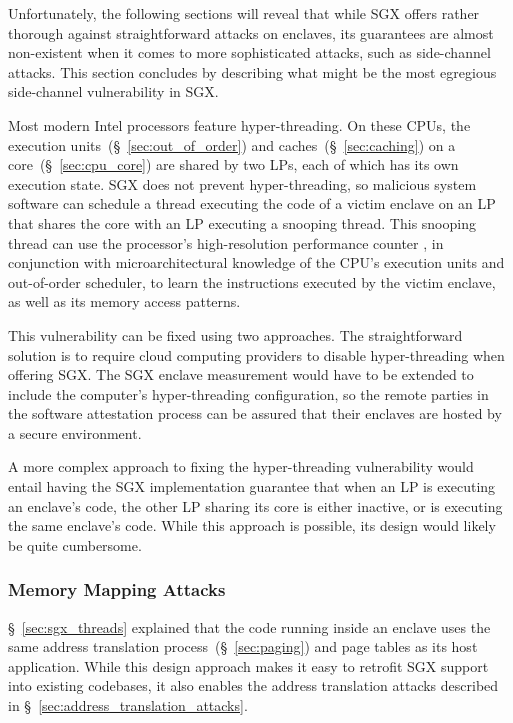 Unfortunately, the following sections will reveal that while SGX offers rather
thorough against straightforward attacks on enclaves, its guarantees are almost
non-existent when it comes to more sophisticated attacks, such as side-channel
attacks. This section concludes by describing what might be the most egregious
side-channel vulnerability in SGX.

Most modern Intel processors feature hyper-threading. On these CPUs, the
execution units~(\S~\ref{sec:out_of_order}) and caches~(\S~\ref{sec:caching})
on a core~(\S~\ref{sec:cpu_core}) are shared by two LPs, each of which has its
own execution state. SGX does not prevent hyper-threading, so malicious system
software can schedule a thread executing the code of a victim enclave on an
LP that shares the core with an LP executing a snooping thread. This snooping
thread can use the processor's high-resolution performance counter
\cite{petters1999making}, in conjunction with microarchitectural knowledge of
the CPU's execution units and out-of-order scheduler, to learn the instructions
executed by the victim enclave, as well as its memory access patterns.

This vulnerability can be fixed using two approaches. The straightforward
solution is to require cloud computing providers to disable hyper-threading
when offering SGX. The SGX enclave measurement would have to be extended to
include the computer's hyper-threading configuration, so the remote parties in
the software attestation process can be assured that their enclaves are hosted
by a secure environment.

A more complex approach to fixing the hyper-threading vulnerability would
entail having the SGX implementation guarantee that when an LP is executing an
enclave's code, the other LP sharing its core is either inactive, or is
executing the same enclave's code. While this approach is possible, its design
would likely be quite cumbersome.


\subsubsection{Memory Mapping Attacks}
\label{sec:sgx_vs_memory_mapping_attacks}

\S~\ref{sec:sgx_threads} explained that the code running inside an enclave uses
the same address translation process~(\S~\ref{sec:paging}) and page tables as
its host application. While this design approach makes it easy to retrofit SGX
support into existing codebases, it also enables the address translation
attacks described in \S~\ref{sec:address_translation_attacks}.

